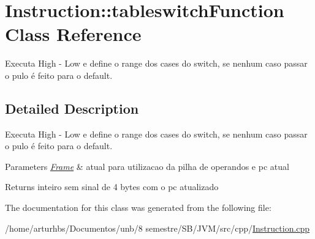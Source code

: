 \hypertarget{classInstruction_1_1tableswitchFunction}{}\section{Instruction\+:\+:tableswitch\+Function Class Reference}
\label{classInstruction_1_1tableswitchFunction}


Executa High -\/ Low e define o range dos cases do switch, se nenhum caso passar o pulo é feito para o default.  




\subsection{Detailed Description}
Executa High -\/ Low e define o range dos cases do switch, se nenhum caso passar o pulo é feito para o default. 


\begin{DoxyParams}{Parameters}
{\em \hyperlink{classFrame}{Frame}} & atual para utilizacao da pilha de operandos e pc atual \\
\hline
\end{DoxyParams}
\begin{DoxyReturn}{Returns}
inteiro sem sinal de 4 bytes com o pc atualizado 
\end{DoxyReturn}


The documentation for this class was generated from the following file\+:\begin{DoxyCompactItemize}
\item 
/home/arturhbs/\+Documentos/unb/8 semestre/\+S\+B/\+J\+V\+M/src/cpp/\hyperlink{Instruction_8cpp}{Instruction.\+cpp}\end{DoxyCompactItemize}
